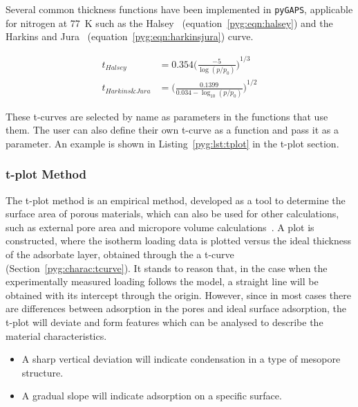 Several common thickness functions have been implemented in \texttt{pyGAPS},
applicable for nitrogen at \SI{77}{\kelvin}
such as the Halsey~\cite{halseyPhysicalAdsorptionNon1948}
(equation~\ref{pyg:eqn:halsey}) and the
Harkins and Jura~\cite{harkinsSurfacesSolidsXIII1944a}
(equation~\ref{pyg:eqn:harkinsjura}) curve.

\begin{align}
	t_{Halsey}        & = 0.354 {\Big(\frac{-5}{\log(p/p_0)}\Big)}^{1/3} \label{pyg:eqn:halsey}                 \\
	t_{Harkins\&Jura} & = {\Big(\frac{0.1399}{0.034 - \log_{10}(p/p_0)}\Big)}^{1/2} \label{pyg:eqn:harkinsjura}
\end{align}

These t-curves are selected by name as parameters in
the functions that use them. The user can also define their
own t-curve as a function and pass it as a parameter. An example
is shown in Listing~\ref{pyg:lst:tplot} in the t-plot section.

\subsubsection{t-plot Method}\label{pyg:charac:tplot}

The t-plot method is an empirical method, developed as a
tool to determine the surface area of porous materials,
which can also be used for other calculations, such as
external pore area and micropore volume
calculations~\cite{lippensStudiesPoreSystems1965}.
A plot is constructed, where the isotherm loading
data is plotted versus the ideal thickness of the adsorbate layer,
obtained through the a t-curve (Section~\ref{pyg:charac:tcurve}).
It stands to reason that, in the case when the experimentally measured
loading follows the model, a straight line will be obtained with its
intercept through the origin. However, since in most cases there
are differences between adsorption in the pores and ideal surface
adsorption, the t-plot will deviate and form features which can
be analysed to describe the material characteristics.

\begin{itemize}

	\item A sharp vertical deviation will indicate condensation
	      in a type of mesopore structure.
	\item A gradual slope will indicate adsorption on a specific
	      surface.

\end{itemize}

